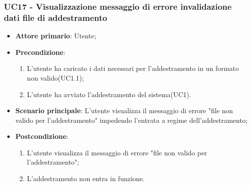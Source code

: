 \subsubsection{UC17 - Visualizzazione messaggio di errore invalidazione dati file di addestramento}
\label{sssec:uc17}
\begin{itemize}
  \item \textbf{Attore primario}: Utente;
  \item \textbf{Precondizione}:
  \begin{enumerate}
		\item L'utente ha caricato i dati necessari per l'addestramento in un formato non valido(UC1.1);
		\item L'utente ha avviato l'addestramento del sistema(UC1).
	\end{enumerate}
  \item \textbf{Scenario principale}: L'utente visualizza il messaggio di errore "file non valido per l'addestramento" impedendo l'entrata a regime dell'addestramento;
  \item \textbf{Postcondizione}:
  \begin{enumerate}
		\item L'utente visualizza il messaggio di errore "file non valido per l'addestramento";
		\item L'addestramento non entra in funzione.
	\end{enumerate}
\end{itemize}

